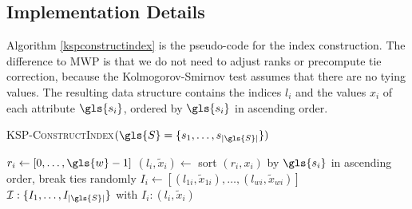 \subsection{Implementation Details}


Algorithm \ref{kspconstructindex} is the pseudo-code for the index construction. The difference to \gls{MWP} is that we do not need to adjust ranks or precompute tie correction, because the Kolmogorov-Smirnov test assumes that there are no tying values. 
The resulting data structure contains the indices $l_i$ and the values $x_i$ of each attribute $\gls{s_i}$, ordered by $\gls{s_i}$ in ascending order. 

\begin{algorithm}\footnotesize
	\caption{ \textsc{\gls{KSP}-ConstructIndex}$(\gls{S} = \{s_1, \dots, s_{|\gls{S}|}\})$}\label{kspconstructindex}
	\begin{algorithmic}[1]
		
		\State $r_i \gets \left[0,\dots,\gls{w}-1\right]$
		\State $(l_i,\tilde{x}_i) \gets$ sort $(r_i, x_i)$ by $\gls{s_i}$ in ascending order, break ties randomly
		\State $I_i \gets \left[(l_{1i}, \tilde{x}_{1i}),\dots,(l_{wi}, \tilde{x}_{wi})\right]$ 
		\EndFor
		 $\mathcal{I}: \{I_1, \dots, I_{|\gls{S}|} \}$ with $I_i: (l_i, \tilde{x}_i)$
	\end{algorithmic}
\end{algorithm}

